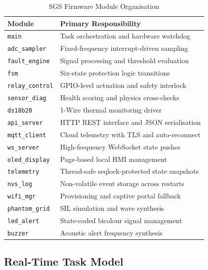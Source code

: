 \documentclass[conference]{IEEEtran}
\begin{document}
\begin{table}[t]
  \caption{SGS Firmware Module Organisation}
  \label{tab:modules}
  \centering
  \renewcommand{\arraystretch}{1.15}
  \begin{tabular}{ll}
    \toprule
    \textbf{Module} & \textbf{Primary Responsibility} \\
    \midrule
    \texttt{main} & Task orchestration and hardware watchdog \\
    \texttt{adc\_sampler} & Fixed-frequency interrupt-driven sampling \\
    \texttt{fault\_engine} & Signal processing and threshold evaluation \\
    \texttt{fsm} & Six-state protection logic transitions \\
    \texttt{relay\_control} & GPIO-level actuation and safety interlock \\
    \texttt{sensor\_diag} & Health scoring and physics cross-checks \\
    \texttt{ds18b20} & 1-Wire thermal monitoring driver \\
    \texttt{api\_server} & HTTP REST interface and JSON serialisation \\
    \texttt{mqtt\_client} & Cloud telemetry with TLS and auto-reconnect \\
    \texttt{ws\_server} & High-frequency WebSocket state pushes \\
    \texttt{oled\_display} & Page-based local HMI management \\
    \texttt{telemetry} & Thread-safe seqlock-protected state snapshots \\
    \texttt{nvs\_log} & Non-volatile event storage across restarts \\
    \texttt{wifi\_mgr} & Provisioning and captive portal fallback \\
    \texttt{phantom\_grid} & SIL simulation and wave synthesis \\
    \texttt{led\_alert} & State-coded bicolour signal management \\
    \texttt{buzzer} & Acoustic alert frequency synthesis \\
    \bottomrule
  \end{tabular}
\end{table}

\subsection{Real-Time Task Model}
\end{document}

